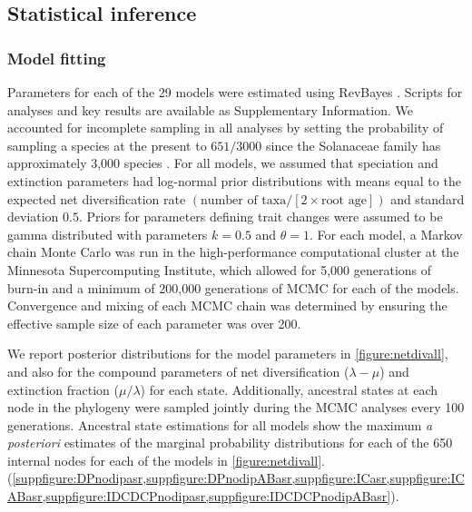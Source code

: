 \subsection{Statistical inference}

\subsubsection{Model fitting}

Parameters for each of the 29 models were estimated using RevBayes \citep{hoehna_2016}.
Scripts for analyses and key results are available as Supplementary Information. %
We accounted for incomplete sampling in all analyses by setting the probability of sampling a species at the present to $651/3000$ \citep[using the method of][]{fitzjohn_2009} since the Solanaceae family has approximately 3,000 species \citep{solsource}.
For all models, we assumed that speciation and extinction parameters had log-normal prior distributions with means equal to the expected net diversification rate $(\text{number of taxa} / [2 \times \text{root age}])$ and standard deviation $0.5$.
Priors for parameters defining trait changes were assumed to be gamma distributed with parameters $k=0.5$ and $\theta=1$. 
For each model, a Markov chain Monte Carlo \citep[MCMC;][]{metropolis1953equation,Hastings1970} was run in the high-performance computational cluster at the Minnesota Supercomputing Institute, which allowed for 5,000 generations of burn-in and a minimum of 200,000 generations of MCMC for each of the  models. %
Convergence and mixing of each MCMC chain was determined by ensuring the effective sample size of each parameter was over 200.

We report posterior distributions for the model parameters in \cref{figure:netdivall}, and also for the compound parameters of net diversification ($\lambda - \mu$) and extinction fraction ($\mu / \lambda$) for each state.
Additionally, ancestral states at each node in the phylogeny were sampled jointly during the MCMC analyses every 100 generations.
Ancestral state estimations for all models show the maximum \emph{a posteriori} estimates of the marginal probability distributions for each of the 650 internal nodes for each of the models in \cref{figure:netdivall}. (\cref{suppfigure:DPnodipasr,suppfigure:DPnodipABasr,suppfigure:ICasr,suppfigure:ICABasr,suppfigure:IDCDCPnodipasr,suppfigure:IDCDCPnodipABasr}). %

